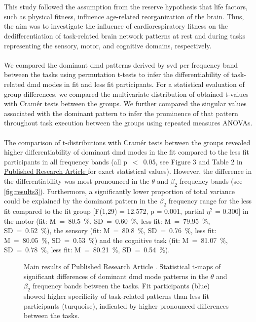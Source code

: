\hyperref[pub:paperIII]{}\\
\\
This study followed the assumption from the reserve hypothesis that life factors, such as physical fitness, influence age-related reorganization of the brain. Thus, the aim was to investigate the influence of cardiorespiratory fitness on the dedifferentiation of task-related brain network patterns at rest and during tasks representing the sensory, motor, and cognitive domains, respectively.\\
\\
We compared the dominant \gls{dmd} patterns derived by \gls{svd} per frequency band between the tasks using permutation t-tests to infer the differentiability of task-related \gls{dmd} modes in fit and less fit participants. For a statistical evaluation of group differences, we compared the multivariate distribution of obtained t-values with Cramér tests between the groups. We further compared the singular values associated with the dominant pattern to infer the prominence of that pattern throughout task execution between the groups using repeated measures ANOVAs.\\
\\
The comparison of t-distributions with Cramér tests between the groups revealed higher differentiability of dominant \gls{dmd} modes in the fit compared to the less fit participants in all frequency bands (all p~$<$~0.05, see Figure 3 and Table 2 in \hyperref[pub:paperIII]{Published Research Article } for exact statistical values). However, the difference in the differentiability was most pronounced in the $\theta$ and $\beta_2$ frequency bands (see \autoref{fig:results3}). Furthermore, a significantly lower proportion of total variance could be explained by the dominant pattern in the $\beta_2$ frequency range for the less fit compared to the fit group [F(1,29) = 12.572, p = 0.001, partial $\eta^{2}$ = 0.300] in the motor (fit: M~=~80.5~\%, SD~=~0.60~\%, less fit: M~=~79.95~\%, SD~=~0.52~\%), the sensory (fit: M~=~80.8~\%, SD~=~0.76~\%, less fit: M~=~80.05~\%, SD~=~0.53~\%) and the cognitive task (fit: M~=~81.07~\%, SD~=~0.78~\%, less fit: M~=~80.21~\%, SD~=~0.54~\%).\\

\begin{figure}[ht]
    \centering
    
    \captionsetup{justification=justified}
    \caption[Main results of Published Research Article ]{Main results of Published Research Article . Statistical t-maps of significant differences of dominant \gls{dmd} mode patterns in the $\theta$ and $\beta_2$ frequency bands between the tasks. Fit participants (blue) showed higher specificity of task-related patterns than less fit participants (turquoise), indicated by higher pronounced differences between the tasks.}
    \label{fig:results3}
\end{figure}

